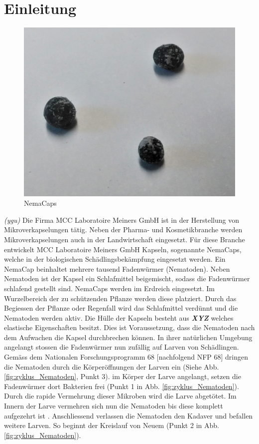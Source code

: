 \newpage
\section{Einleitung}
\begin{figure}
	\includegraphics[scale=0.18]{Illustrationen/3-Einleitung/nemacaps.jpg}
	\caption{NemaCaps}
	\label{fig:nemacaps}
\end{figure}
\textit{(ygu)} Die Firma MCC Laboratoire Meiners GmbH ist in der Herstellung von Mikroverkapselungen tätig. Neben der Pharma- und Kosmetikbranche werden Mikroverkapselungen auch in der Landwirtschaft eingesetzt. Für diese Branche entwickelt MCC Laboratoire Meiners GmbH Kapseln, sogenannte NemaCaps, welche in der biologischen Schädlingsbekämpfung eingesetzt werden. Ein NemaCap beinhaltet mehrere tausend Fadenwürmer (Nematoden). Neben Nematoden ist der Kapsel ein Schlafmittel beigemischt, sodass die Fadenwürmer schlafend gestellt sind. 
\newline
NemaCaps werden im Erdreich eingesetzt. Im Wurzelbereich der zu schützenden Pflanze werden diese platziert. Durch das Begiessen der Pflanze oder Regenfall wird das Schlafmittel verdünnt und die Nematoden werden aktiv. Die Hülle der Kapseln besteht aus \textbf{\textit{XYZ}} welches elastische Eigenschaften besitzt. Dies ist Voraussetzung, dass die Nematoden nach dem Aufwachen die Kapsel durchbrechen können.\newline
In ihrer natürlichen Umgebung angelangt stossen die Fadenwürmer nun zufällig auf Larven von Schädlingen. Gemäss dem Nationalen Forschungsprogramm 68 [nachfolgend NFP 68]\cite{nfp} dringen die Nematoden durch die Körperöffnungen der Larven ein (Siehe Abb.  \ref{fig:zyklus_Nematoden}, Punkt 3). im Körper der Larve angelangt, setzen die Fadenwürmer dort Bakterien frei (Punkt 1 in Abb.  \ref{fig:zyklus_Nematoden}). Durch die rapide Vermehrung dieser Mikroben wird die Larve abgetötet. Im Innern der Larve vermehren sich nun die Nematoden bis diese komplett aufgezehrt ist \cite{nematoden}. Anschliessend verlassen die Nematoden den Kadaver und befallen weitere Larven. So beginnt der Kreislauf von Neuem (Punkt 2 in Abb.  \ref{fig:zyklus_Nematoden}).
\newline


